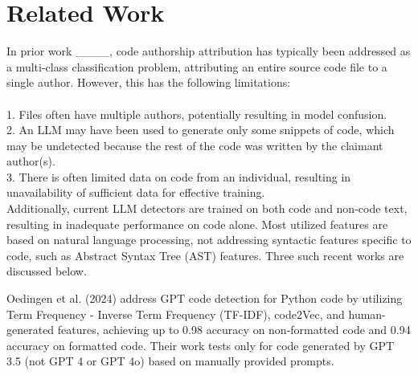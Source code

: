 \section{Related Work}
In prior work ____, code authorship attribution has typically been addressed as a multi-class classification problem, %
attributing an entire source code file to a single author. However, this has the following limitations:
\\\\ %
1. Files %
    often have multiple authors, potentially resulting in model confusion. 
\\    %
2. An LLM may have been used to generate only some snippets of code, which may be undetected because the rest of the code was written by the claimant author(s).
\\ 3. There is often limited data on %
    code from an individual, resulting in %
    unavailability of 
    sufficient data for effective training.\\ %


Additionally, current LLM detectors are trained on %
both code and non-code text, resulting in inadequate performance on code alone. %
Most utilized features are based on %
natural language processing, 
not addressing syntactic features specific to code, such as Abstract Syntax Tree (AST) features. %
Three such recent works are discussed below.


Oedingen et al. (2024)
address GPT code detection %
for Python code by utilizing Term Frequency - Inverse Term Frequency (TF-IDF), code2Vec, and human-generated features, %
achieving up to 0.98 accuracy on non-formatted code and 0.94 accuracy on formatted code. Their work %
tests %
only for code generated by GPT 3.5 (not GPT 4 or GPT 4o)
 based on manually provided %
 prompts.

